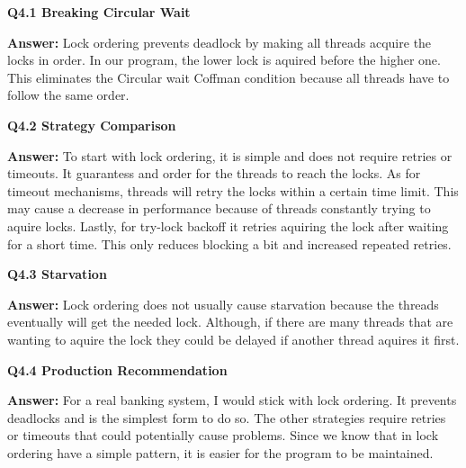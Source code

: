\documentclass[12pt]{article}
\begin{document}
\textbf{Q4.1 Breaking Circular Wait}

\textbf{Answer:}
Lock ordering prevents deadlock by making all threads acquire the locks in order. In our program, the lower lock is aquired before the higher one. This eliminates the Circular wait Coffman condition because all threads have to follow the same order.

\bigskip

\textbf{Q4.2 Strategy Comparison}

\textbf{Answer:}
To start with lock ordering, it is simple and does not require retries or timeouts. It guarantess and order for the threads to reach the locks. As for timeout mechanisms, threads will retry the locks within a certain time limit. This may cause a decrease in performance because of threads constantly trying to aquire locks. Lastly, for try-lock backoff it retries aquiring the lock after waiting for a short time. This only reduces blocking a bit and increased repeated retries.

\bigskip
\textbf{Q4.3 Starvation}

\textbf{Answer:}
Lock ordering does not usually cause starvation because the threads eventually will get the needed lock. Although, if there are many threads that are wanting to aquire the lock they could be delayed if another thread aquires it first.

\bigskip
\textbf{Q4.4 Production Recommendation}

\textbf{Answer:}
For a real banking system, I would stick with lock ordering. It prevents deadlocks and is the simplest form to do so. The other strategies require retries or timeouts that could potentially cause problems. Since we know that in lock ordering have a simple pattern, it is easier for the program to be maintained.

\bigskip
\end{document}
